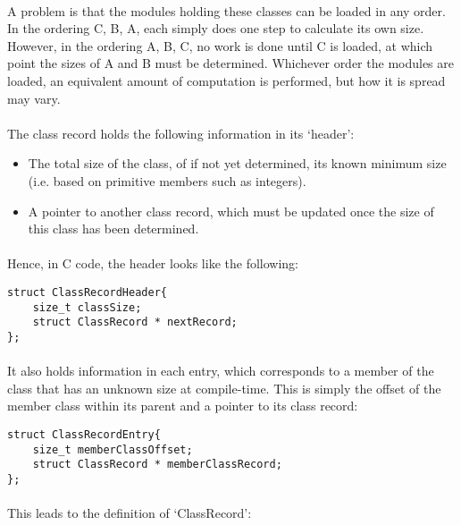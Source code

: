 \documentclass{article}
\begin{document}
\paragraph{}
A problem is that the modules holding these classes can be loaded in any order. In the ordering C, B, A, each simply does one step to calculate its own size. However, in the ordering A, B, C, no work is done until C is loaded, at which point the sizes of A and B must be determined. Whichever order the modules are loaded, an equivalent amount of computation is performed, but how it is spread may vary.

\paragraph{}
The class record holds the following information in its `header':

\begin{itemize}
\item The total size of the class, of if not yet determined, its known minimum size (i.e. based on primitive members such as integers).
\item A pointer to another class record, which must be updated once the size of this class has been determined.
\end{itemize}

\paragraph{}
Hence, in C code, the header looks like the following:

\begin{verbatim}
struct ClassRecordHeader{
    size_t classSize;
    struct ClassRecord * nextRecord;
};
\end{verbatim}

\paragraph{}
It also holds information in each entry, which corresponds to a member of the class that has an unknown size at compile-time. This is simply the offset of the member class within its parent and a pointer to its class record:

\begin{verbatim}
struct ClassRecordEntry{
    size_t memberClassOffset;
    struct ClassRecord * memberClassRecord;
};
\end{verbatim}

\paragraph{}
This leads to the definition of `ClassRecord':
\end{document}
